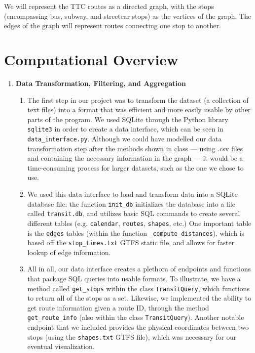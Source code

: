 \documentclass[fontsize=11pt]{article}
\begin{document}
    We will represent the TTC routes as a directed graph, with the stops (encompassing bus, subway, and streetcar stops) as the vertices of the graph. The edges of the graph will represent routes connecting one stop to another.

    \section*{Computational Overview}

    \begin{enumerate}
        \item \textbf{Data Transformation, Filtering, and Aggregation}
        \begin{enumerate}
            \item The first step in our project was to transform the dataset (a collection of text files) into a format that was efficient and more easily usable by other parts of the program. We used SQLite through the Python library \texttt{sqlite3} in order to create a data interface, which can be seen in \texttt{data\_interface.py}. Although we could have modelled our data transformation step after the methods shown in class — using .csv files and containing the necessary information in the graph — it would be a time-consuming process for larger datasets, such as the one we chose to use. \\

            \item We used this data interface to load and transform data into a SQLite database file: the function \texttt{init\_db} initializes the database into a file called \texttt{transit.db}, and utilizes basic SQL commands to create several different tables (e.g. \texttt{calendar}, \texttt{routes}, \texttt{shapes}, etc.) One important table is the \texttt{edges} tables (within the function \texttt{\_compute\_distances}), which is based off the \texttt{stop\_times.txt} GTFS static file, and allows for faster lookup of edge information. \\

            \item All in all, our data interface creates a plethora of endpoints and functions that package SQL queries into usable formats. To illustrate, we have a method called \texttt{get\_stops} within the class \texttt{TransitQuery}, which functions to return all of the stops as a set. Likewise, we implemented the ability to get route information given a route ID, through the method \texttt{get\_route\_info} (also within the class \texttt{TransitQuery}). Another notable endpoint that we included provides the physical coordinates between two stops (using the \texttt{shapes.txt} GTFS file), which was necessary for our eventual visualization. \\


\end{enumerate}
\end{enumerate}
\end{document}
